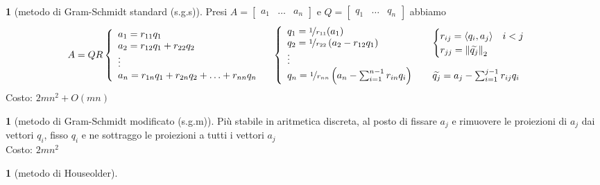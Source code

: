 \documentclass[a4paper,10pt]{article}
\theoremstyle{definition}
\theoremstyle{indentdefinition}
\theoremstyle{indenttheorem}
\theoremstyle{myremark}
\theoremstyle{indentgeneral}
\newtheorem{lyxalgorithm}[thm]{\protect\algorithmname}
\theoremstyle{plain}
\theoremstyle{plain}
\begin{document}
\begin{lyxalgorithm}[metodo di Gram-Schmidt standard (s.g.s)]
Presi $A=\begin{bmatrix}a_{1} & \ldots & a_{n}\end{bmatrix}$ e $Q=\begin{bmatrix}q_{1} & \ldots & q_{n}\end{bmatrix}$ abbiamo
\begin{align*}
 & A=QR\left\{ \begin{array}{l}
a_{1}=r_{11}q_{1}\\
a_{2}=r_{12}q_{1}+r_{22}q_{2}\\
\vdots\\
a_{n}=r_{1n}q_{1}+r_{2n}q_{2}+\ldots+r_{nn}q_{n}
\end{array}\right. &  & \left\{ \begin{array}{l}
q_{1}=\nicefrac{1}{r_{11}}(a_{1})\\
q_{2}=\nicefrac{1}{r_{22}}\left(a_{2}-r_{12}q_{1}\right)\\
\vdots\\
q_{n}=\nicefrac{1}{r_{nn}}\left(a_{n}-\sum_{i=1}^{n-1}r_{in}q_{i}\right)
\end{array}\right. &  & \begin{array}{l}
\begin{cases}
r_{ij}=\left\langle q_{i},a_{j}\right\rangle  & i<j\\
r_{jj}=\left\Vert \widetilde{q_{j}}\right\Vert _{2}
\end{cases}\\
\\
\widetilde{q_{j}}=a_{j}-\sum_{i=1}^{j-1}r_{ij}q_{i}
\end{array}
\end{align*}
Costo: $2mn^2+O(mn)$
\end{lyxalgorithm}

\begin{lyxalgorithm}[metodo di Gram-Schmidt modificato (s.g.m)]
Più stabile in aritmetica discreta, al posto di fissare $a_{j}$
e rimuovere le proiezioni di $a_{j}$ dai vettori $q_{i}$, fisso
$q_{i}$ e ne sottraggo le proiezioni a tutti i vettori $a_{j}$\\
Costo: $2mn^2$
\end{lyxalgorithm}

\begin{lyxalgorithm}[metodo di Houseolder]
\end{lyxalgorithm}
\end{document}
